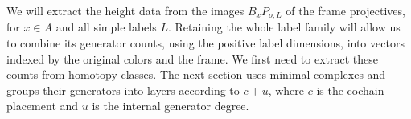 We will extract the height data from the images $B_xP_{o,L}$ of the
frame projectives, for $x\in A$ and all simple labels $L$.  Retaining
the whole label family will allow us to combine its generator counts,
using the positive label dimensions, into vectors indexed by the
original colors and the frame.  We first need to extract these counts
from homotopy classes.  The next section uses minimal complexes and
groups their generators into layers according to $c+u$, where $c$ is
the cochain placement and $u$ is the internal generator degree.
